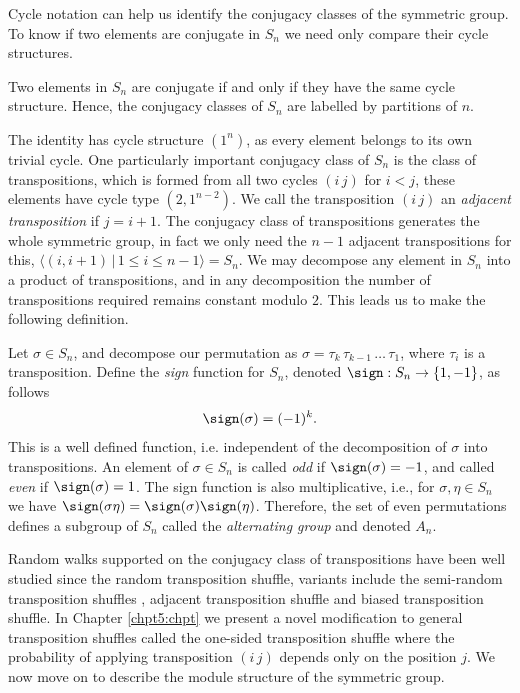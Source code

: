 \documentclass[11pt]{report}
\begin{document}
Cycle notation can help us identify the conjugacy classes of the 
symmetric group. To know if two elements are conjugate in $S_{n}$ we need only compare their cycle structures. 
\begin{lemma}
	\label{chpt4:lem:conjclasses}
	Two elements in $S_{n}$ are conjugate if and only if they have the same 
	cycle structure. Hence, the conjugacy classes of $S_{n}$ are labelled by partitions of $n$.
\end{lemma}
The identity has cycle structure $(1^{n})$, as every element belongs to its own trivial cycle. One particularly important conjugacy class of $S_{n}$ is the class of 
transpositions, which is formed from all two cycles $(i \,j)$ for $i < j$, these elements have cycle type $(2,1^{n-2})$. 
We call the transposition $(i\, j)$ an \emph{adjacent transposition} if $j = i+1$. The conjugacy class of transpositions generates the whole symmetric group, in fact we only need the $n-1$ adjacent transpositions for this, $\langle  (i, i+1) \, | \, 1\leq i \leq n-1 \rangle = S_{n}$. 	We may 
decompose any element in $S_{n}$ into a product of transpositions, and in any decomposition the number of transpositions required remains constant modulo $2$. This leads us to make the following definition.
\begin{defn}
	Let $\sigma \in S_{n}$, and decompose our permutation as $\sigma = \tau_{k} \, \tau_{k-1}\,  \dots \, 
	\tau_{1}$, where $\tau_{i}$ is a transposition. Define the \emph{sign} 
	function for $S_{n}$, denoted $\sign:S_{n} \to \{1,-1\}$, 
	as follows
	\[\sign(\sigma) = (-1)^{k}.\]
	This is a well defined function, i.e. independent of the decomposition 
	of $\sigma$ into transpositions. An element of $\sigma \in S_{n}$ is called \emph{odd} if $\sign(\sigma) =-1$, and called \emph{even} if $\sign(\sigma) =1$. The sign function is also multiplicative, i.e., for $\sigma, \eta \in S_{n}$ we have	$\sign(\sigma \eta) = \sign(\sigma) \sign(\eta)$. Therefore, the set of even permutations defines a subgroup of $S_{n}$ called the \emph{alternating group} and denoted $A_{n}$.
\end{defn}

Random walks supported on the conjugacy class of transpositions have been well studied since the random transposition shuffle, variants include the semi-random transposition shuffles \cite{Mossel2004}, adjacent transposition shuffle \cite{lacoin2016mixing} and biased transposition shuffle\cite{BernsteinBaised}.
In Chapter \ref{chpt5:chpt} we present a novel modification to general transposition shuffles called the one-sided transposition shuffle where the probability of applying transposition $(i\,j)$ depends only on the position $j$.	
We now move on to describe the module structure of the symmetric group.	
\end{document}
